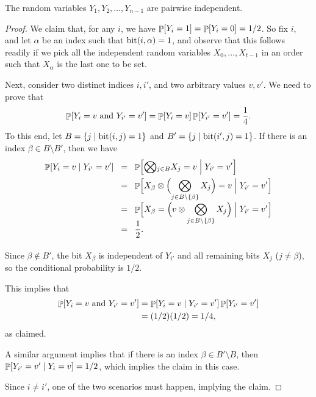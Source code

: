 \begin{lemma}
    The random variables $Y_1, Y_2, \ldots, Y_{n-1}$ are pairwise
    independent.
\end{lemma}
\begin{proof}
    We claim that, for any $i$, we have
    $\Prob{Y_i=1} = \Prob{Y_i=0} =1/2$.  So fix $i$, and let $\alpha$ be an
    index such that $\bitY{i}{\alpha} =1$, and observe that this follows
    readily if we pick all the independent random variables
    $X_0, \ldots, X_{t-1}$ in an order such that $X_\alpha$ is the last
    one to be set.
    
    Next, consider two distinct indices $i,i'$, and two arbitrary
    values $v, v'$. We need to prove that
    \begin{equation*}
        \Prob{Y_{i} = v \text{ and } Y_{i'} = v'}%
        =%
        \Prob{Y_{i} = v} \Prob{ Y_{i'} = v'}%
        =%
        \frac{1}{4}.
    \end{equation*}
    To this end, let $B = \Set{j}{ \bitY{i}{j}=1}$ and
    $B' = \Set{j}{ \bitY{i'}{j}=1}$. If there is an index
    $\beta \in B \setminus B'$, then we have
    \begin{align*}
      \ProbCond{Y_{i} = v}{ Y_{i'} = v' }%
      &\EQ%
        \ProbCond{\Bigl.\smash \bigotimes_{j \in B} X_j= v}{ Y_{i'} = v' }%
        \\&
        \EQ%
        \ProbCond{\Bigl. X_\beta \otimes
        \Bigl(\smash{\bigotimes_{j \in B \setminus \brc{\beta}} X_j}\Bigr)=
        v}{ Y_{i'} = v' }%
      \\[0.2cm]
      &%
        \EQ%
        \ProbCond{\Bigl. X_\beta =
        \Bigl(v \otimes
        \smash{\bigotimes_{j \in B \setminus \brc{\beta}} X_j}\Bigr)}{ Y_{i'} = v' }%
     \\&%
     \EQ%
        \frac{1}{2}.
        \phantom{\bigotimes_{j}}%
    \end{align*}
    Since $\beta \notin B'$, the bit $X_\beta$ is independent of $Y_{i'}$
    and all remaining bits $X_j$ ($j \neq \beta$), so the conditional
    probability is $1/2$.

    This implies that
    \begin{align*}
        \Prob{Y_{i} = v \text{ and } Y_{i'} = v'}%
        &=%
        \ProbCond{Y_{i} = v}{ Y_{i'} = v' } \Prob{Y_{i'} = v'} \\
        &=(1/2)(1/2) = 1/4,
    \end{align*}
    as claimed.

            
    A similar argument implies that if there is an index
    $\beta \in B' \setminus B$, then
    $\mathop{\mathbb{P}}\!\left[ Y_{i'} = v' \;\middle\vert\;  Y_{i} = v  \right] = 1/2$, which implies the
    claim in this case.

    Since $i \neq i'$, one of the two scenarios must happen, implying
    the claim.
\end{proof}        


